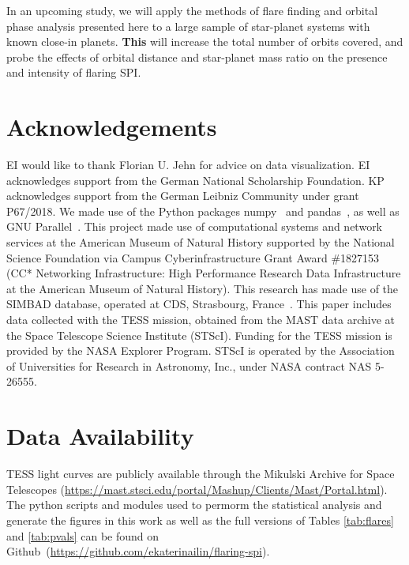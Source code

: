 \documentclass[fleqn,usenatbib]{mnras}%
\begin{document}
In an upcoming study, we will apply the methods of flare finding and orbital phase analysis presented here to a large sample of star-planet systems with known close-in planets. \textbf{This} will increase the total number of orbits covered, and probe the effects of orbital distance and star-planet mass ratio on the presence and intensity of flaring SPI.
\section*{Acknowledgements}
EI would like to thank Florian U. Jehn for advice on data visualization. EI acknowledges support from the German National Scholarship Foundation. KP acknowledges support from the German Leibniz Community under grant P67/2018. We made use of the Python packages numpy~\citep{numpy2020} and pandas~\citep{pandas2010,pandas2020software}, as well as GNU Parallel~\citep{tange2018gnu}. This project made use of computational systems and network services at the American Museum of Natural History supported by the National Science Foundation via Campus Cyberinfrastructure Grant Award \#1827153 (CC* Networking Infrastructure: High Performance Research Data Infrastructure at the American Museum of Natural History). This research has made use of the SIMBAD database, operated at CDS, Strasbourg, France~\citep{wenger2000}. This paper includes data collected with the TESS mission, obtained from the MAST data archive at the Space Telescope Science Institute (STScI). Funding for the TESS mission is provided by the NASA Explorer Program. STScI is operated by the Association of Universities for Research in Astronomy, Inc., under NASA contract NAS 5-26555.

\section*{Data Availability}
TESS light curves are publicly available through the Mikulski Archive for Space Telescopes (\url{https://mast.stsci.edu/portal/Mashup/Clients/Mast/Portal.html}). The python scripts and modules used to permorm the statistical analysis and generate the figures in this work as well as the full versions of Tables \ref{tab:flares} and \ref{tab:pvals} can be found on Github~(\url{https://github.com/ekaterinailin/flaring-spi}).
\end{document}
